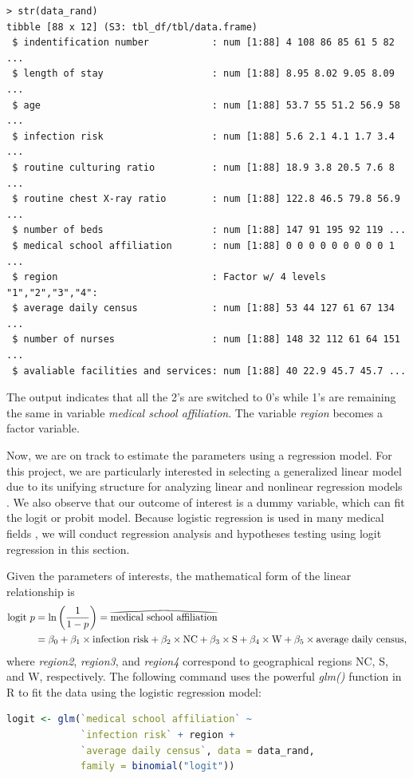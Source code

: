 \documentclass[11pt]{article}
\newcommand\reallywidehat[1]{%
\savestack{\tmpbox}{\stretchto{%
  \scaleto{%
    \scalerel*[\widthof{\ensuremath{#1}}]{\kern-.6pt\bigwedge\kern-.6pt}%
    {\rule[-\textheight/2]{1ex}{\textheight}}%
  }{\textheight}%
}{0.5ex}}%
\stackon[1pt]{#1}{\tmpbox}%
}
\begin{document}
\begin{commandline}
\begin{verbatim}
> str(data_rand)
tibble [88 x 12] (S3: tbl_df/tbl/data.frame)
 $ indentification number           : num [1:88] 4 108 86 85 61 5 82 ...
 $ length of stay                   : num [1:88] 8.95 8.02 9.05 8.09 ...
 $ age                              : num [1:88] 53.7 55 51.2 56.9 58 ...
 $ infection risk                   : num [1:88] 5.6 2.1 4.1 1.7 3.4 ...
 $ routine culturing ratio          : num [1:88] 18.9 3.8 20.5 7.6 8 ...
 $ routine chest X-ray ratio        : num [1:88] 122.8 46.5 79.8 56.9 ...
 $ number of beds                   : num [1:88] 147 91 195 92 119 ...
 $ medical school affiliation       : num [1:88] 0 0 0 0 0 0 0 0 0 1 ...
 $ region                           : Factor w/ 4 levels "1","2","3","4": 
 $ average daily census             : num [1:88] 53 44 127 61 67 134 ...
 $ number of nurses                 : num [1:88] 148 32 112 61 64 151 ...
 $ avaliable facilities and services: num [1:88] 40 22.9 45.7 45.7 ...
\end{verbatim}
\end{commandline}
The output indicates that all the 2's are switched to 0's while 1's are remaining the same in variable \textit{medical school affiliation}. The variable \textit{region} becomes a factor variable. 

Now, we are on track to estimate the parameters using a regression model. For this project, we are particularly interested in selecting a generalized linear model due to its unifying structure for analyzing linear and nonlinear regression models \cite{ar:m_p_c_m_b}. We also observe that our outcome of interest is a dummy variable, which can fit the logit or probit model. Because logistic regression is used in many medical fields \cite{ar:bagley_white_golomb}, we will conduct regression analysis and hypotheses testing using logit regression in this section.

Given the parameters of interests, the mathematical form of the linear relationship is 
\[
\begin{split}
\textrm{logit}\,\, p &= \ln\left(\frac{1}{1-p}\right)=\reallywidehat{\textrm{medical school affiliation}}\\
&=\beta_{0}+\beta_{1}\times\textrm{infection risk}+\beta_{2}\times\textrm{NC}+\beta_{3}\times\textrm{S}+\beta_{4}\times\textrm{W}+\beta_{5}\times\textrm{average daily census},
\end{split}
\]
where \textit{region2}, \textit{region3}, and \textit{region4} correspond
to geographical regions NC, S, and W, respectively. The following command 
uses the powerful \textit{glm()} function in R to fit the data using the logistic regression model:
\begin{file}[hospital.r]
\begin{lstlisting}[language = R] 
logit <- glm(`medical school affiliation` ~ 
             `infection risk` + region + 
             `average daily census`, data = data_rand, 
             family = binomial("logit"))
\end{lstlisting}
\end{file}
\end{document}
